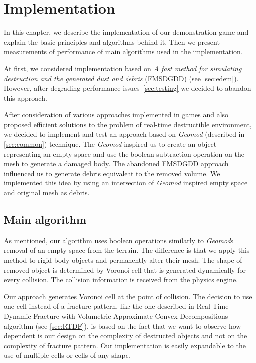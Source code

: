 \chapter{Implementation}
\label{chaptImplementation}
In this chapter, we describe the implementation of our demonstration game and explain the basic principles and algorithms behind it. Then we present measurements of performance of main algorithms used in the implementation.

At first, we considered implementation based on \emph{A fast method for simulating destruction and the generated dust and debris} (FMSDGDD) (see \cref{sec:edem}). However, after degrading performance issues~\cref{sec:testing} we decided to abandon this approach.

After consideration of various approaches implemented in games and also proposed efficient solutions to the problem of real-time destructible environment, we decided to implement and test an approach based on \emph{Geomod} (described in \cref{sec:common}) technique. The \emph{Geomod} inspired us to create an object representing an empty space and use the boolean subtraction operation on the mesh to generate a damaged body. The abandoned FMSDGDD approach influenced us to generate debris equivalent to the removed volume. We implemented this idea by using an intersection of \emph{Geomod} inspired empty space and original mesh as debris.

\section{Main algorithm}
As mentioned, our algorithm uses boolean operations similarly to \emph{Geomod}s removal of an empty space from the terrain. The difference is that we apply this method to rigid body objects and permanently alter their mesh. The shape of removed object is determined by Voronoi cell that is generated dynamically for every collision. The collision information is received from the physics engine.

Our approach generates Voronoi cell at the point of collision. The decision to use one cell instead of a fracture pattern, like the one described in Real Time Dynamic Fracture with Volumetric Approximate Convex Decompositions algorithm (see \cref{sec:RTDF}), is based on the fact that we want to observe how dependent is our design on the complexity of destructed objects and not on the complexity of fracture pattern. Our implementation is easily expandable to the use of multiple cells or cells of any shape. 

